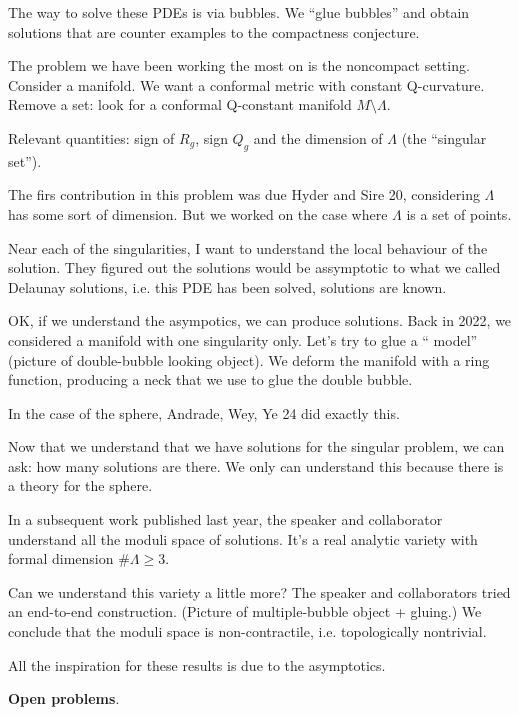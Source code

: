 The way to solve these PDEs is via bubbles.
We ``glue bubbles'' and obtain solutions
that are counter examples to the compactness
conjecture.

The problem we have been working the most on
is the noncompact setting. Consider a
manifold. We want a conformal metric with
constant Q-curvature. Remove a set: look for
a conformal Q-constant manifold
$M\setminus\Lambda$.

Relevant quantities: sign of $R_g$, sign
$Q_g$ and the dimension of $\Lambda$
(the ``singular set'').

The firs contribution in this problem was
due Hyder and Sire 20, considering $\Lambda$
has some sort of dimension. But we worked on
the case where $\Lambda$ is a set of points.

Near each of the singularities, I want to
understand the local behaviour of the
solution. They figured out the solutions
would be assymptotic to what we called
Delaunay solutions, i.e. this PDE has been
solved, solutions are known.

OK, if we understand the asympotics, we can
produce solutions.
Back in 2022, we considered a manifold with
one singularity only. Let's try to glue a ``
model'' (picture of double-bubble looking
object). We deform the manifold with a ring
function, producing a neck that we use to
glue the double bubble.

In the case of the sphere, Andrade, Wey, Ye
24 did exactly this.

Now that we understand that we have
solutions for the singular problem, we can
ask: how many solutions are there. We only
can understand this because there is a
theory for the sphere.

In a subsequent work published last year,
the speaker and collaborator understand all
the moduli space of solutions. It's a real
analytic variety with formal dimension $\#
\Lambda \geq 3$.

Can we understand this variety a little
more? The speaker and collaborators tried an
end-to-end construction. (Picture of
multiple-bubble object + gluing.) We
conclude that the moduli space is
non-contractile, i.e. topologically
nontrivial.

All the inspiration for these results is due
to the asymptotics. 

\medskip\noindent
{\bf Open problems}.

